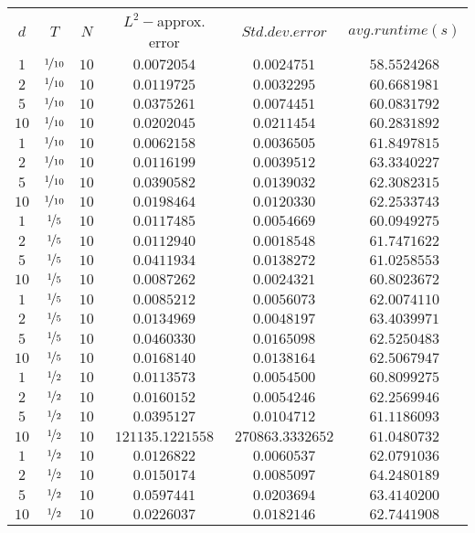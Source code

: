 \begin{tabular}{cccccc}
$d$ & $T$ & $N$ & $L^2-$approx. error & $Std. dev. error$ & $avg. runtime (s)$\\
$1$ & $\nicefrac{1}{10}$ & $10$ & $0.0072054$ & $0.0024751$ & $58.5524268$\\
$2$ & $\nicefrac{1}{10}$ & $10$ & $0.0119725$ & $0.0032295$ & $60.6681981$\\
$5$ & $\nicefrac{1}{10}$ & $10$ & $0.0375261$ & $0.0074451$ & $60.0831792$\\
$10$ & $\nicefrac{1}{10}$ & $10$ & $0.0202045$ & $0.0211454$ & $60.2831892$\\
$1$ & $\nicefrac{1}{10}$ & $10$ & $0.0062158$ & $0.0036505$ & $61.8497815$\\
$2$ & $\nicefrac{1}{10}$ & $10$ & $0.0116199$ & $0.0039512$ & $63.3340227$\\
$5$ & $\nicefrac{1}{10}$ & $10$ & $0.0390582$ & $0.0139032$ & $62.3082315$\\
$10$ & $\nicefrac{1}{10}$ & $10$ & $0.0198464$ & $0.0120330$ & $62.2533743$\\
$1$ & $\nicefrac{1}{5}$ & $10$ & $0.0117485$ & $0.0054669$ & $60.0949275$\\
$2$ & $\nicefrac{1}{5}$ & $10$ & $0.0112940$ & $0.0018548$ & $61.7471622$\\
$5$ & $\nicefrac{1}{5}$ & $10$ & $0.0411934$ & $0.0138272$ & $61.0258553$\\
$10$ & $\nicefrac{1}{5}$ & $10$ & $0.0087262$ & $0.0024321$ & $60.8023672$\\
$1$ & $\nicefrac{1}{5}$ & $10$ & $0.0085212$ & $0.0056073$ & $62.0074110$\\
$2$ & $\nicefrac{1}{5}$ & $10$ & $0.0134969$ & $0.0048197$ & $63.4039971$\\
$5$ & $\nicefrac{1}{5}$ & $10$ & $0.0460330$ & $0.0165098$ & $62.5250483$\\
$10$ & $\nicefrac{1}{5}$ & $10$ & $0.0168140$ & $0.0138164$ & $62.5067947$\\
$1$ & $\nicefrac{1}{2}$ & $10$ & $0.0113573$ & $0.0054500$ & $60.8099275$\\
$2$ & $\nicefrac{1}{2}$ & $10$ & $0.0160152$ & $0.0054246$ & $62.2569946$\\
$5$ & $\nicefrac{1}{2}$ & $10$ & $0.0395127$ & $0.0104712$ & $61.1186093$\\
$10$ & $\nicefrac{1}{2}$ & $10$ & $121135.1221558$ & $270863.3332652$ & $61.0480732$\\
$1$ & $\nicefrac{1}{2}$ & $10$ & $0.0126822$ & $0.0060537$ & $62.0791036$\\
$2$ & $\nicefrac{1}{2}$ & $10$ & $0.0150174$ & $0.0085097$ & $64.2480189$\\
$5$ & $\nicefrac{1}{2}$ & $10$ & $0.0597441$ & $0.0203694$ & $63.4140200$\\
$10$ & $\nicefrac{1}{2}$ & $10$ & $0.0226037$ & $0.0182146$ & $62.7441908$\\
\end{tabular}
